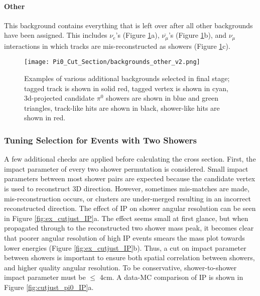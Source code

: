 \paragraph{Other}
This background contains everything that is left over after all other backgrounds have been assigned.  This includes $\nu_e$'s (Figure \ref{fig:backgrounds_other}a), $\overline{\nu_\mu}$'s (Figure \ref{fig:backgrounds_other}b), and $\nu_\mu$ interactions in which tracks are mis-reconstructed as showers (Figure \ref{fig:backgrounds_other}c).

\begin{figure}[H]
\centering
\texttt{[image: Pi0\_Cut\_Section/backgrounds\_other\_v2.png]}
\caption{ Examples of various additional backgrounds selected in final stage; tagged track is shown in solid red, tagged vertex is shown in cyan, 3d-projected candidate $\pi^0$ showers are shown in blue and green triangles, track-like hits are shown in black, shower-like hits are shown in red. }
\label{fig:backgrounds_other}
\end{figure}


\subsubsection{Tuning Selection for Events with Two Showers}
A few additional checks are applied before calculating the cross section.  First, the impact parameter of every two shower permutation is considered.  Small impact parameters between most shower pairs are expected because the candidate vertex is used to reconstruct 3D direction. However, sometimes mis-matches are made, mis-reconstruction occurs, or clusters are under-merged resulting in an incorrect reconstructed direction. The effect of IP on shower angular resolution can be seen in Figure \ref{fig:ex_cutjust_IP}a. The effect seems small at first glance, but when propagated through to the reconstructed two shower mass peak, it becomes clear that poorer angular resolution of high IP events smears the mass plot towards lower energies (Figure \ref{fig:ex_cutjust_IP}b). Thus, a cut on impact parameter between showers is important to ensure both spatial correlation between showers, and higher quality angular resolution.  To be conservative, shower-to-shower impact parameter must be $\leq$ 4cm.  A data-MC comparison of IP is shown in Figure \ref{fig:cutjust_pi0_IP}a. 

